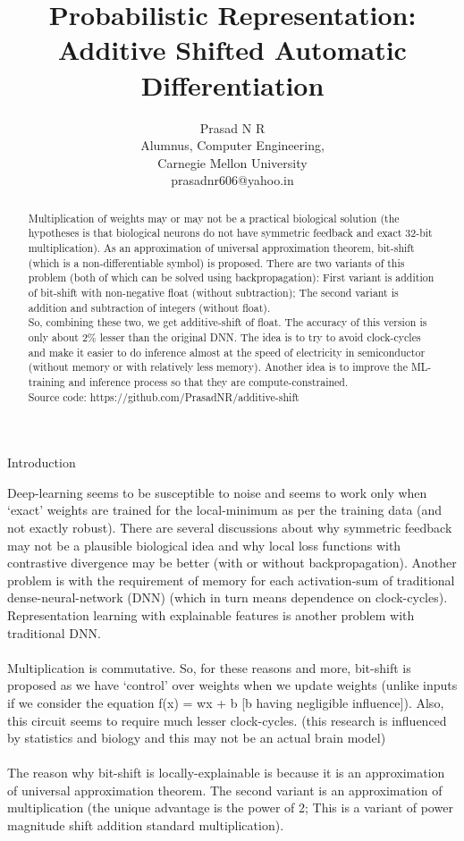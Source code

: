 \documentclass{article}
\title{Probabilistic Representation: Additive Shifted Automatic Differentiation}
\author{Prasad N R\\Alumnus, Computer Engineering, \\Carnegie Mellon University\\prasadnr606@yahoo.in}
\begin{document}
\maketitle
	\begin{abstract}
		Multiplication of weights may or may not be a practical biological solution (the hypotheses is that biological neurons do not have symmetric feedback and exact 32-bit multiplication). As an approximation of universal approximation theorem, bit-shift (which is a non-differentiable symbol) is proposed. There are two variants of this problem (both of which can be solved using backpropagation): First variant is addition of bit-shift with non-negative float (without subtraction); The second variant is addition and subtraction of integers (without float).\\
		
		So, combining these two, we get additive-shift of float. The accuracy of this version is only about 2\% lesser than the original DNN. The idea is to try to avoid clock-cycles and make it easier to do inference almost at the speed of electricity in semiconductor (without memory or with relatively less memory). Another idea is to improve the ML-training and inference process so that they are compute-constrained.\\
		
		Source code: https://github.com/PrasadNR/additive-shift
	\end{abstract}
	
	\begin{section}{Introduction}
		
		Deep-learning seems to be susceptible to noise and seems to work only when `exact' weights are trained for the local-minimum as per the training data (and not exactly robust).\cite{blindDescent} There are several discussions about why symmetric feedback may not be a plausible biological idea and why local loss functions with contrastive divergence may be better (with or without backpropagation).\cite{FFA} Another problem is with the requirement of memory for each activation-sum of traditional dense-neural-network (DNN) (which in turn means dependence on clock-cycles).\cite{blindDescent} Representation learning with explainable features is another problem with traditional DNN.\cite{explainableDeepLearning}\\\\
		Multiplication is commutative. So, for these reasons and more, bit-shift is proposed as we have `control' over weights when we update weights (unlike inputs if we consider the equation f(x) = wx + b [b having negligible influence]). Also, this circuit seems to require much lesser clock-cycles. (this research is influenced by statistics and biology and this may not be an actual brain model)\\\\
		The reason why bit-shift is locally-explainable is because it is an approximation of universal approximation theorem. The second variant is an approximation of multiplication (the unique advantage is the power of 2; This is a variant of power magnitude shift addition standard multiplication).
	\end{section}
\end{document}
